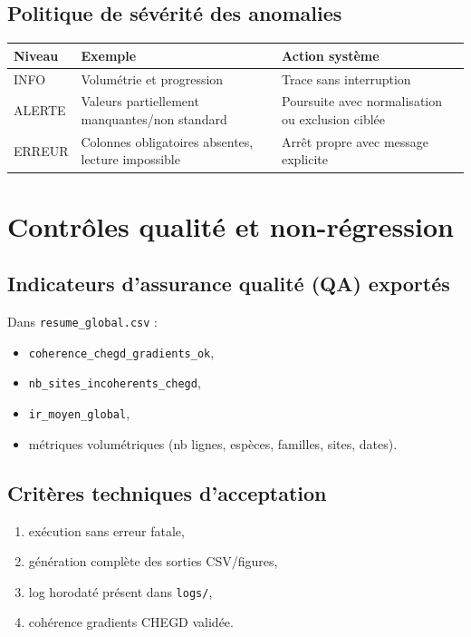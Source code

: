 \documentclass[11pt,a4paper]{article}
\begin{document}
\subsection{Politique de s\'ev\'erit\'e des anomalies}
\begin{center}\begin{tabular}{>{\raggedright\arraybackslash}p{}>{\raggedright\arraybackslash}p{}>{\raggedright\arraybackslash}p{}}
\toprule
\textbf{Niveau} & \textbf{Exemple} & \textbf{Action système} \\
\midrule
INFO & Volum\'etrie et progression & Trace sans interruption \\
ALERTE & Valeurs partiellement manquantes/non standard & Poursuite avec normalisation ou exclusion cibl\'ee \\
ERREUR & Colonnes obligatoires absentes, lecture impossible & Arrêt propre avec message explicite \\
\bottomrule
\end{tabular}\end{center}

\section{Contrôles qualit\'e et non-r\'egression}
\subsection{Indicateurs d'assurance qualit\'e (QA) export\'es}
Dans \texttt{resume\_global.csv} :
\begin{itemize}[leftmargin=1.2cm]
  \item \texttt{coherence\_chegd\_gradients\_ok},
  \item \texttt{nb\_sites\_incoherents\_chegd},
  \item \texttt{ir\_moyen\_global},
  \item m\'etriques volum\'etriques (nb lignes, espèces, familles, sites, dates).
\end{itemize}

\subsection{Critères techniques d'acceptation}
\begin{enumerate}[leftmargin=1.2cm]
  \item ex\'ecution sans erreur fatale,
  \item g\'en\'eration complète des sorties CSV/figures,
  \item log horodat\'e pr\'esent dans \texttt{logs/},
  \item coh\'erence gradients CHEGD valid\'ee.
\end{enumerate}
\end{document}
